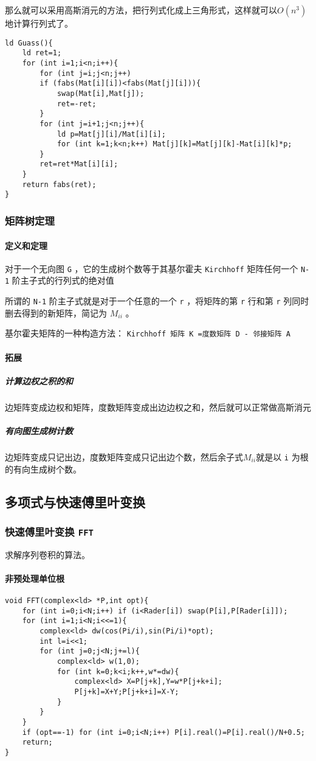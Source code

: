 \documentclass[UTF-8]{ctexart}
\begin{document}
	那么就可以采用高斯消元的方法，把行列式化成上三角形式，这样就可以$O(n^3)$地计算行列式了。
\begin{verbatim}
ld Guass(){
    ld ret=1;
    for (int i=1;i<n;i++){
        for (int j=i;j<n;j++)
        if (fabs(Mat[i][i])<fabs(Mat[j][i])){
            swap(Mat[i],Mat[j]);
            ret=-ret;
        }
        for (int j=i+1;j<n;j++){
            ld p=Mat[j][i]/Mat[i][i];
            for (int k=1;k<n;k++) Mat[j][k]=Mat[j][k]-Mat[i][k]*p;
        }
        ret=ret*Mat[i][i];
    }
    return fabs(ret);
}
\end{verbatim}
	\subsubsection{矩阵树定理}
	\paragraph{定义和定理} 对于一个无向图 \texttt{G} ，它的生成树个数等于其基尔霍夫 \texttt{Kirchhoff} 矩阵任何一个 \texttt{N-1} 阶主子式的行列式的绝对值  
	
	所谓的 \texttt{N-1} 阶主子式就是对于一个任意的一个 \texttt{r} ，将矩阵的第 \texttt{r} 行和第 \texttt{r} 列同时删去得到的新矩阵，简记为 $M _ {ii}$ 。
	
	基尔霍夫矩阵的一种构造方法：  
	\texttt{Kirchhoff 矩阵 K =度数矩阵 D - 邻接矩阵 A}
	
	\paragraph{拓展}
	\subparagraph{计算边权之积的和} 边矩阵变成边权和矩阵，度数矩阵变成出边边权之和，然后就可以正常做高斯消元
	
	\subparagraph{有向图生成树计数} 边矩阵变成只记出边，度数矩阵变成只记出边个数，然后余子式$M _ {ii}$就是以 \texttt{i} 为根的有向生成树个数。
	
	\subsection{多项式与快速傅里叶变换}
	\subsubsection{快速傅里叶变换 \texttt{FFT}}
	求解序列卷积的算法。
	\paragraph{非预处理单位根}
\begin{verbatim}
void FFT(complex<ld> *P,int opt){
    for (int i=0;i<N;i++) if (i<Rader[i]) swap(P[i],P[Rader[i]]);
    for (int i=1;i<N;i<<=1){
        complex<ld> dw(cos(Pi/i),sin(Pi/i)*opt);
        int l=i<<1;
        for (int j=0;j<N;j+=l){
            complex<ld> w(1,0);
            for (int k=0;k<i;k++,w*=dw){
                complex<ld> X=P[j+k],Y=w*P[j+k+i];
                P[j+k]=X+Y;P[j+k+i]=X-Y;
            }
        }
    }
    if (opt==-1) for (int i=0;i<N;i++) P[i].real()=P[i].real()/N+0.5;
    return;
}
\end{verbatim}
\end{document}
